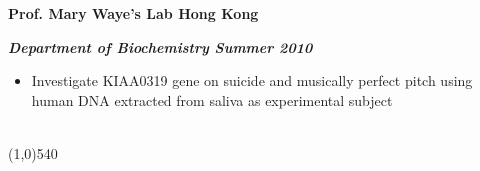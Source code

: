 \documentclass[dvips,11pt]{article}
\begin{document}
\noindent\centerline{\bf Prof. Mary Waye's Lab \hfill	Hong Kong}
\noindent\centerline{\textbf{\textit{Department of Biochemistry \hfill Summer 2010}}}
\vspace{-2mm}
\begin{itemize} \itemsep1pt \parskip0pt 
	\setlength{\itemsep}{0pt}
	\item Investigate KIAA0319 gene on suicide and musically perfect pitch using human DNA extracted from saliva as experimental subject
\end{itemize}

\bigskip
\newpage
{} \vspace{-1.5mm}
\noindent\\
\vspace{-6mm}
\line(1,0){540}\\
\end{document}
